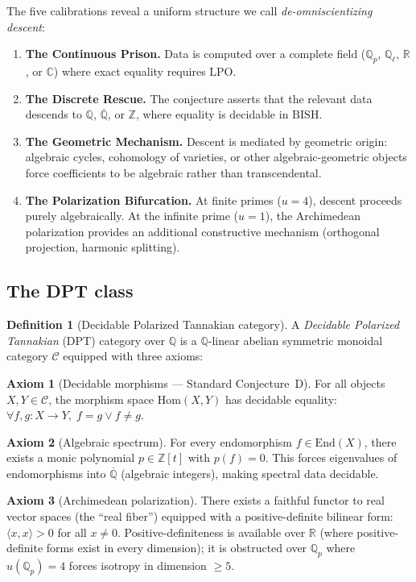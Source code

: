 \documentclass[11pt]{article}
\theoremstyle{definition}
\newtheorem{definition}[theorem]{Definition}
\theoremstyle{remark}
\newcommand{\Z}{\mathbb{Z}}
\newcommand{\Q}{\mathbb{Q}}
\newcommand{\R}{\mathbb{R}}
\newcommand{\C}{\mathbb{C}}
\newcommand{\Qbar}{\overline{\Q}}
\newcommand{\Qell}{\Q_\ell}
\newcommand{\Qp}{\Q_p}
\newcommand{\LPO}{\mathrm{LPO}}
\newcommand{\BISH}{\mathrm{BISH}}
\newcommand{\ip}[2]{\langle #1, #2 \rangle}
\begin{document}
The five calibrations reveal a uniform structure we call \emph{de-omniscientizing descent}:
\begin{enumerate}
\item \textbf{The Continuous Prison.} Data is computed over a complete field ($\Qp$, $\Qell$, $\R$, or $\C$) where exact equality requires $\LPO$.
\item \textbf{The Discrete Rescue.} The conjecture asserts that the relevant data descends to $\Q$, $\Qbar$, or $\Z$, where equality is decidable in $\BISH$.
\item \textbf{The Geometric Mechanism.} Descent is mediated by geometric origin: algebraic cycles, cohomology of varieties, or other algebraic-geometric objects force coefficients to be algebraic rather than transcendental.
\item \textbf{The Polarization Bifurcation.} At finite primes ($u = 4$), descent proceeds purely algebraically. At the infinite prime ($u = 1$), the Archimedean polarization provides an additional constructive mechanism (orthogonal projection, harmonic splitting).
\end{enumerate}

\subsection{The DPT class}

\begin{definition}[Decidable Polarized Tannakian category]
\label{def:DPT}
A \emph{Decidable Polarized Tannakian} (DPT) category over $\Q$ is a $\Q$-linear abelian symmetric monoidal category $\mathcal{C}$ equipped with three axioms:

\smallskip
\textbf{Axiom 1} (Decidable morphisms --- Standard Conjecture~D). For all objects $X, Y \in \mathcal{C}$, the morphism space $\mathrm{Hom}(X,Y)$ has decidable equality: $\forall f,g : X \to Y,\; f = g \lor f \neq g$.

\smallskip
\textbf{Axiom 2} (Algebraic spectrum). For every endomorphism $f \in \mathrm{End}(X)$, there exists a monic polynomial $p \in \Z[t]$ with $p(f) = 0$. This forces eigenvalues of endomorphisms into $\Qbar$ (algebraic integers), making spectral data decidable.

\smallskip
\textbf{Axiom 3} (Archimedean polarization). There exists a faithful functor to real vector spaces (the ``real fiber'') equipped with a positive-definite bilinear form: $\ip{x}{x} > 0$ for all $x \neq 0$. Positive-definiteness is available over $\R$ (where positive-definite forms exist in every dimension); it is obstructed over $\Qp$ where $u(\Qp) = 4$ forces isotropy in dimension $\geq 5$.
\end{definition}
\end{document}
